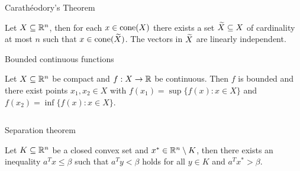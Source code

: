 \begin{frame}{Carathéodory's Theorem}

\begin{theorem}
  Let $X\subseteq\mathbb{R}^n$, then for each $x \in \operatorname{\mathrm{cone}}(X)$ there exists a set
  $\widetilde{X}\subseteq X$ of cardinality at most $n$  such that $x \in
  \operatorname{\mathrm{cone}}(\widetilde{X})$. The vectors in $\widetilde{X}$ are linearly independent. 
\end{theorem}

\end{frame}



\begin{frame}
  
\end{frame}


\begin{frame}{Bounded continuous functions}

\begin{theorem}

  Let $X\subseteq\mathbb{R}^n$ be compact and $f: X \to \mathbb{R}$ be continuous. Then $f$ is
  bounded and there exist
  points $x_1,x_2 \in X$ with $f(x_1) = \sup\{ f(x) \colon  x \in X\}$ and
  $f(x_2) = \inf \{ f(x) \colon x \in X\}$. 
\end{theorem}
  
  \begin{columns}
    \begin{column}{.5\textwidth}
      
    \end{column}
    \begin{column}{.5\textwidth}
      
    \end{column}       
  \end{columns}
\end{frame}



\begin{frame}
  
\end{frame}

\begin{frame}{Separation theorem}

\begin{theorem}

  Let $K\subseteq\mathbb{R}^n$ be a closed  convex set and $x^* \in \mathbb{R}^n \setminus K$, then there
  exists an inequality $a^Tx ≤ \beta$ such that $a^T y < \beta$ holds for all
  $y \in K$ and $a^Tx^*>\beta$. 
\end{theorem}

  \begin{columns}
    \begin{column}{.5\textwidth}
      
    \end{column}
    \begin{column}{.5\textwidth}
      
    \end{column}       
  \end{columns}
\end{frame}







